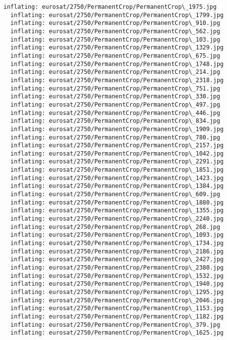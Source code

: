 \documentclass[11pt]{article}
\begin{document}
\begin{Verbatim}[commandchars=\\\{\}]
  inflating: eurosat/2750/PermanentCrop/PermanentCrop\_1975.jpg
  inflating: eurosat/2750/PermanentCrop/PermanentCrop\_1799.jpg
  inflating: eurosat/2750/PermanentCrop/PermanentCrop\_910.jpg
  inflating: eurosat/2750/PermanentCrop/PermanentCrop\_562.jpg
  inflating: eurosat/2750/PermanentCrop/PermanentCrop\_103.jpg
  inflating: eurosat/2750/PermanentCrop/PermanentCrop\_1329.jpg
  inflating: eurosat/2750/PermanentCrop/PermanentCrop\_675.jpg
  inflating: eurosat/2750/PermanentCrop/PermanentCrop\_1748.jpg
  inflating: eurosat/2750/PermanentCrop/PermanentCrop\_214.jpg
  inflating: eurosat/2750/PermanentCrop/PermanentCrop\_2318.jpg
  inflating: eurosat/2750/PermanentCrop/PermanentCrop\_751.jpg
  inflating: eurosat/2750/PermanentCrop/PermanentCrop\_330.jpg
  inflating: eurosat/2750/PermanentCrop/PermanentCrop\_497.jpg
  inflating: eurosat/2750/PermanentCrop/PermanentCrop\_446.jpg
  inflating: eurosat/2750/PermanentCrop/PermanentCrop\_834.jpg
  inflating: eurosat/2750/PermanentCrop/PermanentCrop\_1909.jpg
  inflating: eurosat/2750/PermanentCrop/PermanentCrop\_780.jpg
  inflating: eurosat/2750/PermanentCrop/PermanentCrop\_2157.jpg
  inflating: eurosat/2750/PermanentCrop/PermanentCrop\_1042.jpg
  inflating: eurosat/2750/PermanentCrop/PermanentCrop\_2291.jpg
  inflating: eurosat/2750/PermanentCrop/PermanentCrop\_1851.jpg
  inflating: eurosat/2750/PermanentCrop/PermanentCrop\_1423.jpg
  inflating: eurosat/2750/PermanentCrop/PermanentCrop\_1384.jpg
  inflating: eurosat/2750/PermanentCrop/PermanentCrop\_609.jpg
  inflating: eurosat/2750/PermanentCrop/PermanentCrop\_1880.jpg
  inflating: eurosat/2750/PermanentCrop/PermanentCrop\_1355.jpg
  inflating: eurosat/2750/PermanentCrop/PermanentCrop\_2240.jpg
  inflating: eurosat/2750/PermanentCrop/PermanentCrop\_268.jpg
  inflating: eurosat/2750/PermanentCrop/PermanentCrop\_1093.jpg
  inflating: eurosat/2750/PermanentCrop/PermanentCrop\_1734.jpg
  inflating: eurosat/2750/PermanentCrop/PermanentCrop\_2186.jpg
  inflating: eurosat/2750/PermanentCrop/PermanentCrop\_2427.jpg
  inflating: eurosat/2750/PermanentCrop/PermanentCrop\_2380.jpg
  inflating: eurosat/2750/PermanentCrop/PermanentCrop\_1532.jpg
  inflating: eurosat/2750/PermanentCrop/PermanentCrop\_1940.jpg
  inflating: eurosat/2750/PermanentCrop/PermanentCrop\_1295.jpg
  inflating: eurosat/2750/PermanentCrop/PermanentCrop\_2046.jpg
  inflating: eurosat/2750/PermanentCrop/PermanentCrop\_1153.jpg
  inflating: eurosat/2750/PermanentCrop/PermanentCrop\_1182.jpg
  inflating: eurosat/2750/PermanentCrop/PermanentCrop\_379.jpg
  inflating: eurosat/2750/PermanentCrop/PermanentCrop\_1625.jpg

\end{Verbatim}
\end{document}
